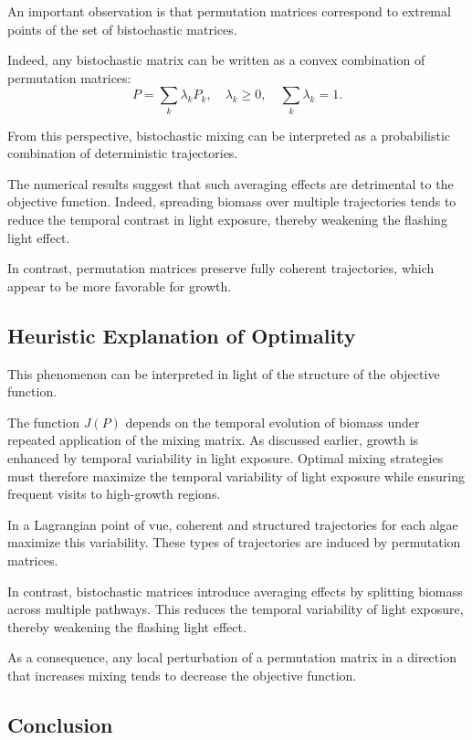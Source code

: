 \documentclass{article}
\begin{document}
An important observation is that permutation matrices correspond to extremal points 
of the set of bistochastic matrices.

Indeed, any bistochastic matrix can be written as a convex combination of permutation matrices:
\[
P = \sum_{k} \lambda_k P_k, \quad \lambda_k \geq 0, \quad \sum_k \lambda_k = 1.
\]

From this perspective, bistochastic mixing can be interpreted as a probabilistic 
combination of deterministic trajectories.

The numerical results suggest that such averaging effects are detrimental to the objective function. 
Indeed, spreading biomass over multiple trajectories tends to reduce the temporal contrast in light exposure, 
thereby weakening the flashing light effect.

In contrast, permutation matrices preserve fully coherent trajectories, which appear to be more favorable 
for growth.

\subsection{Heuristic Explanation of Optimality}


This phenomenon can be interpreted in light of the structure of the objective function.

The function $J(P)$ depends on the temporal evolution of biomass under repeated application 
of the mixing matrix. As discussed earlier, growth is enhanced by temporal variability 
in light exposure. Optimal mixing strategies must therefore maximize the temporal variability of light exposure 
while ensuring frequent visits to high-growth regions.

In a Lagrangian point of vue, coherent and structured trajectories for each algae maximize 
this variability. These types of trajectories are induced by permutation matrices.

In contrast, bistochastic matrices introduce averaging effects by splitting biomass 
across multiple pathways. This reduces the temporal variability of light exposure, 
thereby weakening the flashing light effect.

As a consequence, any local perturbation of a permutation matrix in a direction 
that increases mixing tends to decrease the objective function.


\subsection{Conclusion}
\end{document}
